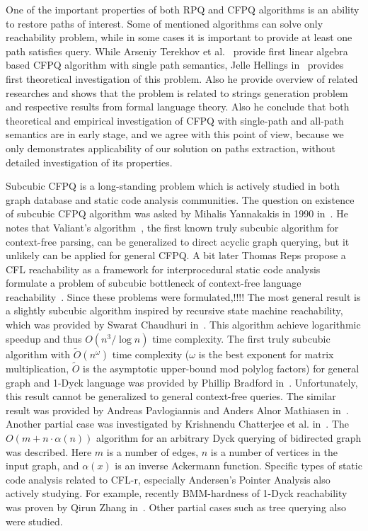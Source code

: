 One of the important properties of both RPQ and CFPQ algorithms is an ability to restore paths of interest. 
Some of mentioned algorithms can solve only reachability problem, while in some cases it is important to provide at least one path satisfies query. 
While Arseniy Terekhov et al.~\cite{10.1145/3398682.3399163} provide first linear algebra based CFPQ algorithm with single path semantics, Jelle Hellings in~\cite{!!!} provides first theoretical investigation of this problem. Also he provide overview of related researches and shows that the problem is related to strings generation problem and respective results from formal language theory.
Also he conclude that both theoretical and empirical investigation of CFPQ with single-path and all-path semantics are in early stage, and we agree with this point of view, because we only demonstrates applicability of our solution on paths extraction, without detailed investigation of its properties.

Subcubic CFPQ is a long-standing problem which is actively studied in both graph database and static code analysis communities.
The question on existence of subcubic CFPQ algorithm was asked by Mihalis Yannakakis in 1990 in~\cite{Yannakakis}.
He notes that Valiant's algorithm~\cite{10.1016/S0022-0000(75)80046-8}, the first known truly subcubic algorithm for context-free parsing, can be generalized to direct acyclic graph querying, but it unlikely can be applied for general CFPQ. 
A bit later Thomas Reps propose a CFL reachability as a framework for interprocedural  static code analysis formulate a problem of subcubic bottleneck of context-free language reachability~\cite{!!!}.
Since these problems were formulated,!!!!
The most general result is a slightly subcubic algorithm inspired by recursive state machine reachability, which was provided by Swarat Chaudhuri in~\cite{10.1145/1328897.1328460}.
This algorithm achieve logarithmic speedup and thus $O(n^3/\log{n})$ time complexity. 
The first truly subcubic algorithm with $\widetilde{O}(n^\omega)$ time complexity ($\omega$ is the best exponent for matrix multiplication, $\widetilde{O}$ is the asymptotic upper-bound mod polylog factors) for general graph and 1-Dyck language was provided by Phillip Bradford in~\cite{Bradford2017EfficientEP}. Unfortunately, this result cannot be generalized to general context-free queries.
The similar result was provided by Andreas Pavlogiannis and Anders Alnor Mathiasen in~\cite{pavlogiannis2020finegrained}.
Another partial case was investigated by Krishnendu Chatterjee et al. in~\cite{10.1145/3158118}.
The $O(m + n \cdot \alpha(n))$ algorithm for an arbitrary Dyck querying of bidirected graph was described. Here $m$ is a number of edges, $n$ is a number of vertices in the input graph, and $\alpha(x)$ is an inverse Ackermann function.
Specific types of static code analysis related to CFL-r, especially Andersen's Pointer Analysis also actively studying.
For example, recently BMM-hardness of 1-Dyck reachability was proven by	Qirun Zhang in~\cite{zhang2020conditional}.
Other partial cases such as tree querying also were studied.

